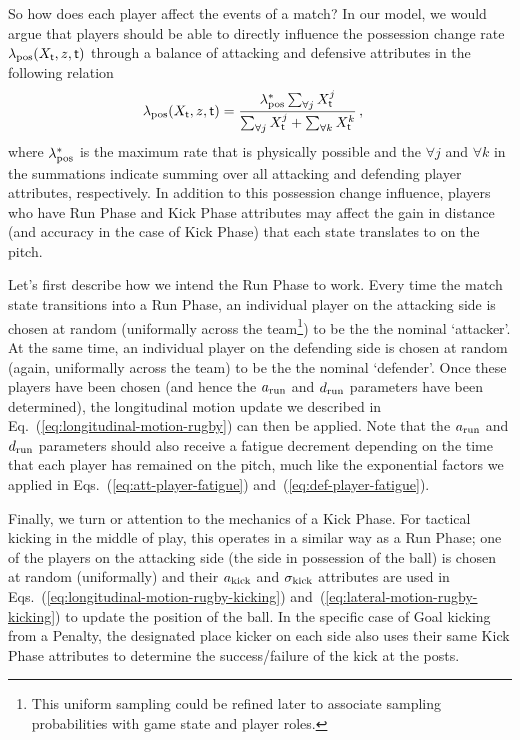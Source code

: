 So how does each player affect the events of a match? In our model, we would argue that players should be able to directly influence the possession change rate $\lambda_{\rm pos}(X_{\sf t}, z, {\sf t})$ through a balance of attacking and defensive attributes in the following relation
\begin{align}
\lambda_{\rm pos}(X_{\sf t}, z, {\sf t}) &= \frac{\lambda^*_{\rm pos}\sum_{\forall j}X^j_{{\sf t}}}{\sum_{\forall j}X^j_{{\sf t}} + \sum_{\forall k}X^k_{{\sf t}}}\,,
\end{align}
where $\lambda^*_{\rm pos}$ is the maximum rate that is physically possible and the $\forall j$ and $\forall k$ in the summations indicate summing over all attacking and defending player attributes, respectively. In addition to this possession change influence, players who have {\sf Run Phase} and {\sf Kick Phase} attributes may affect the gain in distance (and accuracy in the case of {\sf Kick Phase}) that each state translates to on the pitch. 

Let's first describe how we intend the {\sf Run Phase} to work. Every time the match state transitions into a {\sf Run Phase}, an individual player on the attacking side is chosen at random (uniformally across the team\footnote{This uniform sampling could be refined later to associate sampling probabilities with game state and player roles.}) to be the the nominal `attacker'. At the same time, an individual player on the defending side is chosen at random (again, uniformally across the team) to be the the nominal `defender'. Once these players have been chosen (and hence the $a_{\rm run}$ and $d_{\rm run}$ parameters have been determined), the longitudinal motion update we described in Eq.~(\ref{eq:longitudinal-motion-rugby}) can then be applied. Note that the $a_{\rm run}$ and $d_{\rm run}$ parameters should also receive a fatigue decrement depending on the time that each player has remained on the pitch, much like the exponential factors we applied in Eqs.~(\ref{eq:att-player-fatigue}) and~(\ref{eq:def-player-fatigue}).

Finally, we turn or attention to the mechanics of a {\sf Kick Phase}. For tactical kicking in the middle of play, this operates in a similar way as a {\sf Run Phase}; one of the players on the attacking side (the side in possession of the ball) is chosen at random (uniformally) and their $a_{\rm kick}$ and $\sigma_{\rm kick}$ attributes are used in Eqs.~(\ref{eq:longitudinal-motion-rugby-kicking}) and~(\ref{eq:lateral-motion-rugby-kicking}) to update the position of the ball. In the specific case of {\sf Goal} kicking from a {\sf Penalty}, the designated place kicker on each side also uses their same {\sf Kick Phase} attributes to determine the success/failure of the kick at the posts.

